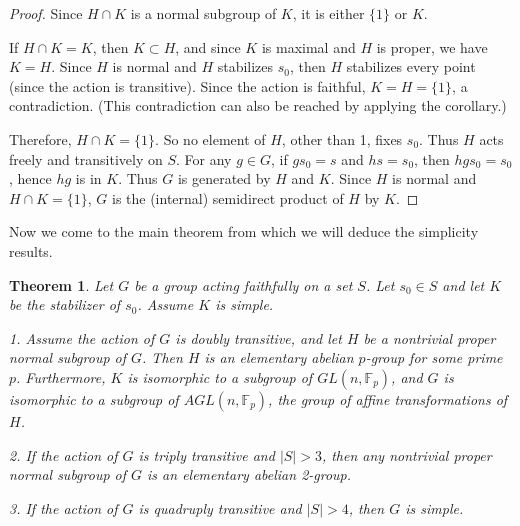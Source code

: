 \documentclass[12pt]{article}
\newtheorem{thm}{Theorem}
\newcommand{\F}{\mathbb{F}}
\begin{document}
\begin{proof}
Since $H \cap K$ is a normal subgroup of $K$, it is either $\{1\}$ or $K$.

If $H \cap K = K$, then $K \subset H$, and since $K$ is maximal and $H$ is proper, we have $K=H$.  Since $H$ is normal and $H$ stabilizes $s_0$, then $H$ stabilizes every point (since the action is transitive).  Since the action is faithful, $K = H = \{1\}$, a contradiction.  (This contradiction can also be reached by applying the corollary.)

Therefore, $H \cap K = \{1\}$.  So no element of $H$, other than 1, fixes $s_0$.  Thus $H$ acts freely and transitively on $S$.  For any $g \in G$, if $g s_0 = s$ and $h s = s_0$, then $h g s_0 = s_0$, hence $h g$ is in $K$.  Thus $G$ is generated by $H$ and $K$.  Since $H$ is normal and $H \cap K = \{1\}$, $G$ is the (internal) semidirect product of $H$ by $K$.
\end{proof}

Now we come to the main theorem from which we will deduce the simplicity results.

\begin{thm}
Let $G$ be a group acting faithfully on a set $S$.  Let $s_0 \in S$ and let $K$ be the stabilizer of $s_0$.  Assume $K$ is simple.

1. Assume the action of $G$ is doubly transitive, and let $H$ be a nontrivial proper normal subgroup of $G$.  Then $H$ is an elementary abelian $p$-group for some prime $p$.  Furthermore, $K$ is isomorphic to a subgroup of $GL(n,\F_p)$, and $G$ is isomorphic to a subgroup of $AGL(n,\F_p)$, the group of affine transformations of $H$.

2. If the action of $G$ is triply transitive and $|S|>3$, then any nontrivial proper normal subgroup of $G$ is an elementary abelian 2-group.

3. If the action of $G$ is quadruply transitive and $|S|>4$, then $G$ is simple.
\end{thm}
\end{document}
